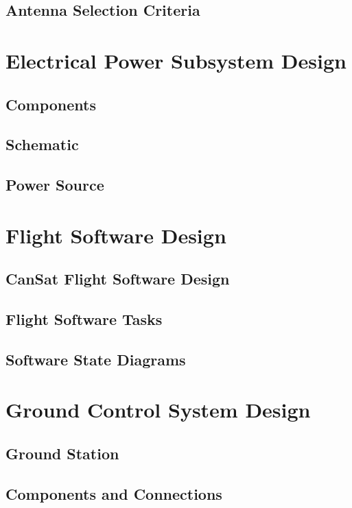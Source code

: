 \documentclass[10pt]{article}
\begin{document}
\subsection{Antenna Selection Criteria}

\newpage

\section{Electrical Power Subsystem Design}
\subsection{Components}
\subsection{Schematic}
\subsection{Power Source}

\newpage

\section{Flight Software Design}
\subsection{CanSat Flight Software Design}
\subsection{Flight Software Tasks}
\subsection{Software State Diagrams}

\newpage

\section{Ground Control System Design}
\subsection{Ground Station}
\subsection{Components and Connections}
\end{document}
